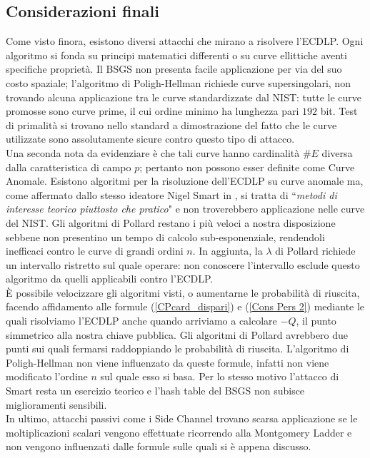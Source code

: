 \documentclass[a4paper,12pt]{tesiinfo}
\begin{document}
\subsection{Considerazioni finali}
\label{ecdlp conclusioni}
Come visto finora, esistono diversi attacchi che mirano a risolvere l'ECDLP. Ogni algoritmo si fonda su principi matematici differenti o su curve ellittiche aventi specifiche propriet\`a. Il BSGS non presenta facile applicazione per via del suo costo spaziale; l'algoritmo di Poligh-Hellman richiede curve supersingolari, non trovando alcuna applicazione tra le curve standardizzate dal NIST: tutte le curve promosse sono curve prime, il cui ordine minimo ha lunghezza pari $192$ bit. Test di primalit\`a si trovano nello standard \cite{dss} a dimostrazione del fatto che le curve utilizzate sono assolutamente sicure contro questo tipo di attacco. 
\\
Una seconda nota da evidenziare \`e che tali curve hanno cardinalit\`a $\#E$ diversa dalla caratteristica di campo $p$; pertanto non possono esser definite come Curve Anomale. Esistono algoritmi per la risoluzione dell'ECDLP su curve anomale ma, come affermato dallo stesso ideatore Nigel Smart in \cite{ev_curv2}, si tratta di ``\emph{metodi di interesse teorico piuttosto che pratico}" e non troverebbero applicazione nelle curve del NIST. Gli algoritmi di Pollard restano i pi\`u veloci a nostra disposizione sebbene non presentino un tempo di calcolo sub-esponenziale, rendendoli inefficaci contro le curve di grandi ordini $n$. In aggiunta, la $\lambda$ di Pollard richiede un intervallo ristretto sul quale operare: non conoscere l'intervallo esclude questo algoritmo da quelli applicabili contro l'ECDLP.
\\
\`E possibile velocizzare gli algoritmi visti, o aumentarne le probabilit\`a di riuscita, facendo affidamento alle formule (\ref{CPcard_dispari}) e (\ref{Cons Pers 2}) mediante le quali risolviamo l'ECDLP anche quando arriviamo a calcolare $-Q$, il punto simmetrico alla nostra chiave pubblica. Gli algoritmi di Pollard avrebbero due punti sui quali fermarsi raddoppiando le probabilit\`a di riuscita. L'algoritmo di Poligh-Hellman non viene influenzato da queste formule, infatti non viene modificato l'ordine $n$ sul quale esso si basa. Per lo stesso motivo l'attacco di Smart resta un esercizio teorico e l'hash table del BSGS non subisce miglioramenti sensibili.
\\
In ultimo, attacchi passivi come i Side Channel trovano scarsa applicazione se le moltiplicazioni scalari vengono effettuate ricorrendo alla Montgomery Ladder e non vengono influenzati dalle formule sulle quali si \`e appena discusso.
%
%
%
%
%
%
%
%
\end{document}
